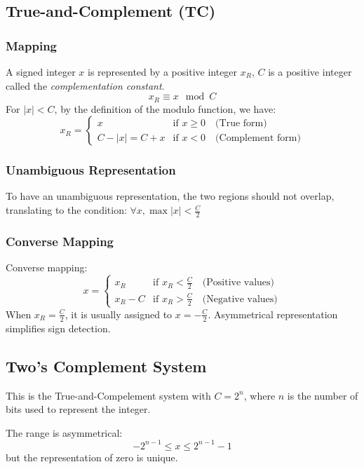 \documentclass[10pt,a4paper]{book}
\begin{document}
\subsection{True-and-Complement (TC)}

\subsubsection{Mapping}
A signed integer $x$ is represented by a positive integer $x_R$, $C$ is a positive integer called the \textit{complementation constant}.
\[ x_R \equiv x \mod C \]	          
For $|x| < C$, by the definition of the modulo function, we have:
\[x_R = 
	\begin{cases} 
		x				& \text{if } x \geq 0 \quad \text{(True form)}    \\
		C - |x| = C + x 	& \text{if } x < 0 \quad \text{(Complement form)} 
	\end{cases}
		      \]
	
\subsubsection{Unambiguous Representation}
To have an unambiguous representation, the two regions should not overlap, translating to the condition:
		$\forall x, \max |x| < \frac{C}{2}$

\subsubsection{Converse Mapping}
Converse mapping:
\[x = 
	\begin{cases} 
		x_R     & \text{if } x_R < \frac{C}{2} \quad \text{(Positive values)} \\
		x_R - C & \text{if } x_R > \frac{C}{2} \quad \text{(Negative values)} 
	\end{cases}\]
When $x_R = \frac{C}{2}$, it is usually assigned to $x = -\frac{C}{2}$. Asymmetrical representation simplifies sign detection.

\subsection{Two's Complement System}
This is the True-and-Compelement system with $C = 2^n$, where $n$ is the number of bits used to represent the integer.\par 
The range is asymmetrical:
\[ -2^{n-1} \leq x \leq 2^{n-1} - 1\]
but the representation of zero is unique.
	
\end{document}
